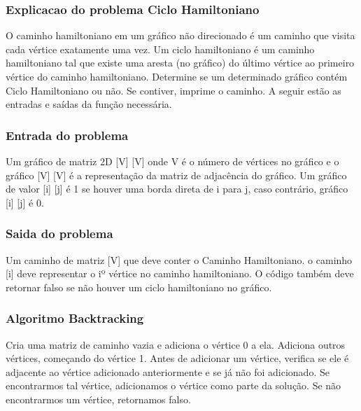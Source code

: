 \subsubsection*{Explicacao do problema Ciclo Hamiltoniano}

O caminho hamiltoniano em um gráfico não direcionado é um caminho que visita cada vértice exatamente uma vez. 
Um ciclo hamiltoniano é um caminho hamiltoniano tal que existe uma aresta (no gráfico) do último vértice ao primeiro vértice do caminho hamiltoniano. 
Determine se um determinado gráfico contém Ciclo Hamiltoniano ou não. Se contiver, imprime o caminho. A seguir estão as entradas e saídas da função necessária.

\subsubsection*{Entrada do problema}

Um gráfico de matriz 2D [V] [V] onde V é o número de vértices no gráfico e o gráfico [V] [V] é a representação da matriz de adjacência do gráfico. 
Um gráfico de valor [i] [j] é 1 se houver uma borda direta de i para j, caso contrário, gráfico [i] [j] é 0.

\subsubsection*{Saida do problema}

Um caminho de matriz [V] que deve conter o Caminho Hamiltoniano. o caminho [i] deve representar o iº vértice no caminho hamiltoniano. 
O código também deve retornar falso se não houver um ciclo hamiltoniano no gráfico.

\subsubsection*{Algoritmo Backtracking}  

Cria uma matriz de caminho vazia e adiciona o vértice 0 a ela. 
Adiciona outros vértices, começando do vértice 1. 
Antes de adicionar um vértice, verifica se ele é adjacente ao vértice adicionado anteriormente e se já não foi adicionado. 
Se encontrarmos tal vértice, adicionamos o vértice como parte da solução. 
Se não encontrarmos um vértice, retornamos falso.
